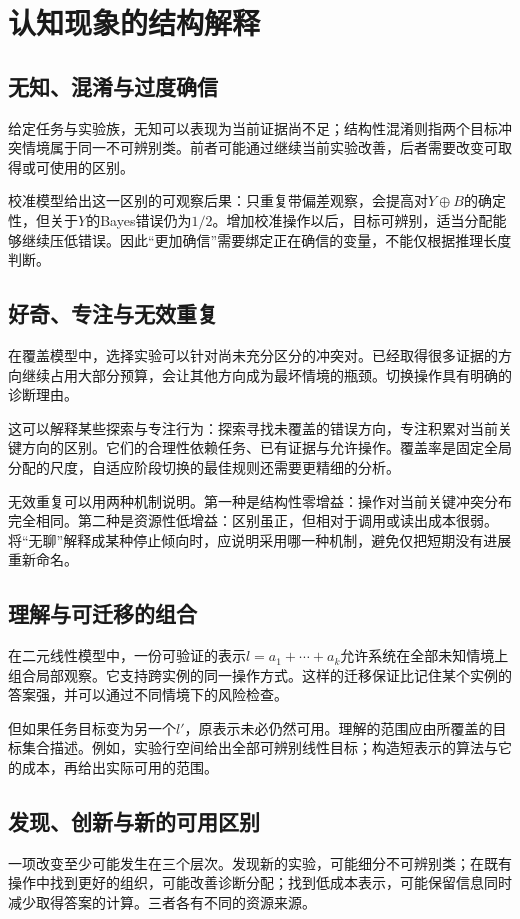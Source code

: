 \chapter{认知现象的结构解释}
\label{ch:interpretation}

\section{无知、混淆与过度确信}
给定任务与实验族，无知可以表现为当前证据尚不足；结构性混淆则指两个目标冲突情境属于同一不可辨别类。前者可能通过继续当前实验改善，后者需要改变可取得或可使用的区别。

校准模型给出这一区别的可观察后果：只重复带偏差观察，会提高对$Y\oplus B$的确定性，但关于$Y$的Bayes错误仍为$1/2$。增加校准操作以后，目标可辨别，适当分配能够继续压低错误。因此“更加确信”需要绑定正在确信的变量，不能仅根据推理长度判断。

\section{好奇、专注与无效重复}
在覆盖模型中，选择实验可以针对尚未充分区分的冲突对。已经取得很多证据的方向继续占用大部分预算，会让其他方向成为最坏情境的瓶颈。切换操作具有明确的诊断理由。

这可以解释某些探索与专注行为：探索寻找未覆盖的错误方向，专注积累对当前关键方向的区别。它们的合理性依赖任务、已有证据与允许操作。覆盖率是固定全局分配的尺度，自适应阶段切换的最佳规则还需要更精细的分析。

无效重复可以用两种机制说明。第一种是结构性零增益：操作对当前关键冲突分布完全相同。第二种是资源性低增益：区别虽正，但相对于调用或读出成本很弱。将“无聊”解释成某种停止倾向时，应说明采用哪一种机制，避免仅把短期没有进展重新命名。

\section{理解与可迁移的组合}
在二元线性模型中，一份可验证的表示$l=a_1+\cdots+a_k$允许系统在全部未知情境上组合局部观察。它支持跨实例的同一操作方式。这样的迁移保证比记住某个实例的答案强，并可以通过不同情境下的风险检查。

但如果任务目标变为另一个$l'$，原表示未必仍然可用。理解的范围应由所覆盖的目标集合描述。例如，实验行空间给出全部可辨别线性目标；构造短表示的算法与它的成本，再给出实际可用的范围。

\section{发现、创新与新的可用区别}
一项改变至少可能发生在三个层次。发现新的实验，可能细分不可辨别类；在既有操作中找到更好的组织，可能改善诊断分配；找到低成本表示，可能保留信息同时减少取得答案的计算。三者各有不同的资源来源。

